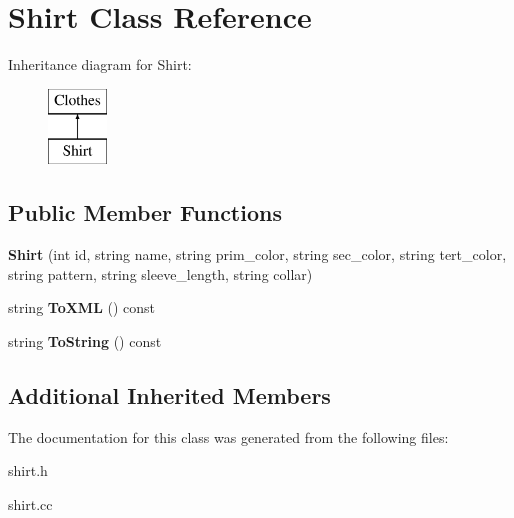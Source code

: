 \hypertarget{classShirt}{}\section{Shirt Class Reference}
\label{classShirt}
Inheritance diagram for Shirt\+:\begin{figure}[H]
\begin{center}
\leavevmode
\includegraphics[height=2.000000cm]{classShirt}
\end{center}
\end{figure}
\subsection*{Public Member Functions}
\begin{DoxyCompactItemize}
\item 
\mbox{\label{classShirt_a5df3975569b7f5874a905d31e4056b7b}} 
{\bfseries Shirt} (int id, string name, string prim\+\_\+color, string sec\+\_\+color, string tert\+\_\+color, string pattern, string sleeve\+\_\+length, string collar)
\item 
\mbox{\label{classShirt_ae636e58135bd1ca4ac590e55e8d47cac}} 
string {\bfseries To\+X\+ML} () const
\item 
\mbox{\label{classShirt_ab85aaa20a603d63f4144d1b42d9b616d}} 
string {\bfseries To\+String} () const
\end{DoxyCompactItemize}
\subsection*{Additional Inherited Members}


The documentation for this class was generated from the following files\+:\begin{DoxyCompactItemize}
\item 
shirt.\+h\item 
shirt.\+cc\end{DoxyCompactItemize}
